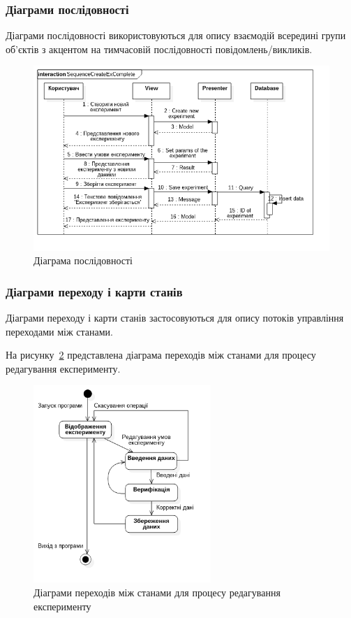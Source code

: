 \subsubsection{Діаграми послідовності}
Діаграми послідовності використовуються для опису взаємодій всередині групи об'єктів з акцентом на тимчасовій послідовності повідомлень/викликів.

\begin{figure}[H]
  \centering
    \includegraphics[width=1\textwidth]{uml_sequence_experiment}
  \caption{Діаграма послідовності}
  \label{fig:uml_sequence_experiment}
\end{figure}

\subsubsection{Діаграми переходу і карти станів}
Діаграми переходу і карти станів застосовуються для опису потоків управління переходами між станами.

На рисунку~\ref{fig:uml_statechart_experiment_edit} представлена діаграма переходів між станами для процесу редагування експерименту.

\begin{figure}[H]
  \centering
    \includegraphics[width=0.6\textwidth]{uml_statechart_experiment_edit}
  \caption{Діаграми переходів між станами для процесу редагування експерименту}
  \label{fig:uml_statechart_experiment_edit}
\end{figure}

